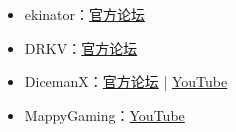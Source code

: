 \begin{itemize}
\item ekinator：\href{https://forums.terraria.org/index.php?members/ekinator.61186/}{官方论坛}
\item DRKV：\href{https://forums.terraria.org/index.php?members/drkv.67603/}{官方论坛}
\item DicemanX：\href{https://forums.terraria.org/index.php?members/dicemanx.1706/}{官方论坛} | \href{https://www.youtube.com/channel/UCllYBm-_FbqWuI92o6zPXfw}{YouTube}
\item MappyGaming：\href{https://www.youtube.com/channel/UC-u6c7ppGML6icciJ0Q1oWQ}{YouTube}
\end{itemize}